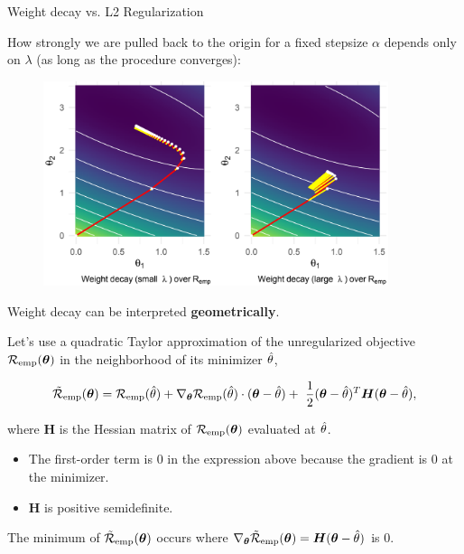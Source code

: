 \begin{vbframe}{Weight decay vs. L2 Regularization}
\framebreak

How strongly we are pulled back to the origin for a fixed stepsize $\alpha$ depends only on $\lambda$ (as long as the procedure converges):

\begin{figure}
\includegraphics[width=0.9\textwidth]{figure_man/L2-regularization02.png}\\
\end{figure}


\framebreak

Weight decay can be interpreted \textbf{geometrically}.

\lz

Let's use a quadratic Taylor approximation of the unregularized objective $\mathcal{R}_{\text{emp}}(\bm{\theta})$ in the neighborhood of its minimizer $\hat{\theta}$,

$$ \mathcal{\tilde R}_{\text{emp}}(\bm{\theta})= \mathcal{R}_{\text{emp}}(\hat{\theta}) + \nabla_{\bm{\theta}} \mathcal{R}_{\text{emp}}(\hat{\theta})\cdot(\bm{\theta} - \hat{\theta}) + \ \frac{1}{2} (\bm{\theta} - \hat{\theta})^T \bm{H} (\bm{\theta} - \hat{\theta}), $$

where $\bm{H}$ is the Hessian matrix of $\mathcal{R}_{\text{emp}}(\bm{\theta})$ evaluated at $\hat{\theta}$.

\lz

\begin{itemize}
  \item The first-order term is 0 in the expression above because the gradient is $0$ at the minimizer.
  \item $\bm{H}$ is positive semidefinite.
\end{itemize}

\lz

\framebreak

\normalsize

The minimum of $\mathcal{\tilde R}_{\text{emp}}(\bm{\theta})$ occurs where $\nabla_{\bm{\theta}}\mathcal{\tilde R}_{\text{emp}}(\bm{\theta}) = \bm{H}(\bm{\theta} - \hat{\theta})$ is $0$.


\end{vbframe}
